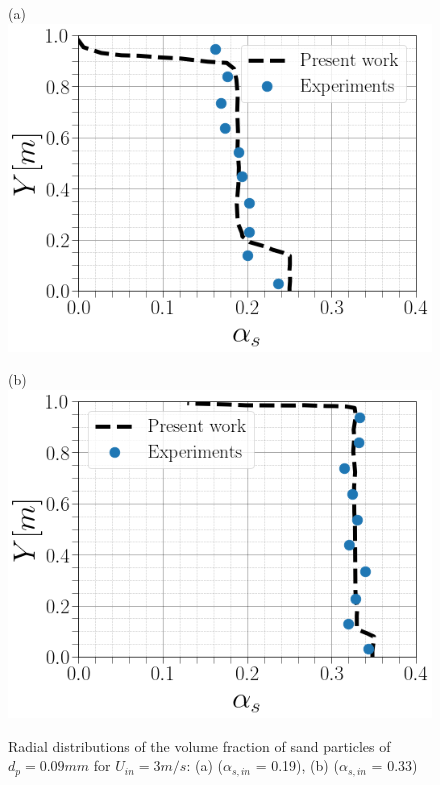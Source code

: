 \documentclass[11pt]{report}
\begin{document}
\begin{minipage}[t]{0.35\textwidth}
\begin{minipage}[t]{0.5\textwidth}
\begin{minipage}[t]{0.35\textwidth}
\begin{minipage}[t]{0.35\textwidth}
\begin{figure}[ht!]
\begin{center}
 (a)\includegraphics[scale = 0.3]{figs/3C}
 \end{center}
 \end{figure}
%
 \begin{figure}[ht!]
 \begin{center}
 (b)\includegraphics[scale = 0.3]{figs/C33}
 \end{center}
 \end{figure}
%
 \begin{figure}[ht!]
 \centering
 \caption{Radial distributions of the volume fraction of sand particles of $d_p= 0.09 mm$ for $U_{in} = 3 m/s$: (a) ($\alpha_{s,in}$ = 0.19), (b) ($\alpha_{s,in}$ = 0.33) }
 \label{solid}
 \end{figure}

\end{minipage}
\end{minipage}
\end{minipage}
\end{minipage}
\end{document}
